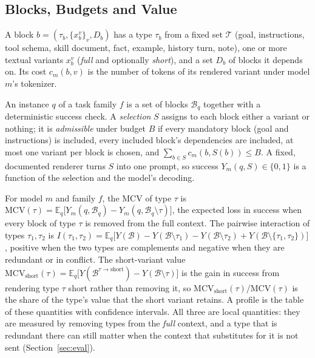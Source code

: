 
\subsection{Blocks, Budgets and Value}
\begin{definition}\label{def:block}
A block $b=(\tau_b,\{x_b^v\}_v,D_b)$ has a type $\tau_b$ from a fixed set $\mathcal{T}$ (goal, instructions, tool schema,
skill document, fact, example, history turn, note), one or more textual variants $x_b^v$ (\emph{full} and optionally
\emph{short}), and a set $D_b$ of blocks it depends on. Its cost $c_m(b,v)$ is the number of tokens of its rendered variant
under model $m$'s tokenizer.
\end{definition}

An instance $q$ of a task family $f$ is a set of blocks $\mathcal{B}_q$ together with a deterministic success check. A
\emph{selection} $S$ assigns to each block either a variant or nothing; it is \emph{admissible} under budget $B$ if every
mandatory block (goal and instructions) is included, every included block's dependencies are included, at most one
variant per block is chosen, and $\sum_{b\in S} c_m(b,S(b))\le B$. A fixed, documented renderer turns $S$ into one prompt,
so success $Y_m(q,S)\in\{0,1\}$ is a function of the selection and the model's decoding.

\begin{definition}\label{def:mcv}
For model $m$ and family $f$, the MCV of type $\tau$ is
$\mathrm{MCV}(\tau)=\mathbb{E}_q\big[Y_m(q,\mathcal{B}_q)-Y_m(q,\mathcal{B}_q\setminus\tau)\big]$,
the expected loss in success when every block of type $\tau$ is removed from the full context. The pairwise interaction
of types $\tau_1,\tau_2$ is
$I(\tau_1,\tau_2)=\mathbb{E}_q\big[Y(\mathcal{B})-Y(\mathcal{B}\setminus\tau_1)-Y(\mathcal{B}\setminus\tau_2)+
Y(\mathcal{B}\setminus\{\tau_1,\tau_2\})\big]$,
positive when the two types are complements and negative when they are redundant or in conflict. The short-variant value
$\mathrm{MCV}_{\mathrm{short}}(\tau)=\mathbb{E}_q\big[Y(\mathcal{B}^{\tau\to\mathrm{short}})-Y(\mathcal{B}\setminus\tau)\big]$
is the gain in success from rendering type $\tau$ short rather than removing it, so
$\mathrm{MCV}_{\mathrm{short}}(\tau)/\mathrm{MCV}(\tau)$ is the share of the type's value that the short variant retains.
A profile is the table of these quantities with confidence intervals. All three are local quantities: they are measured
by removing types from the \emph{full} context, and a type that is redundant there can still matter when the context
that substitutes for it is not sent (Section~\ref{sec:eval}).
\end{definition}


